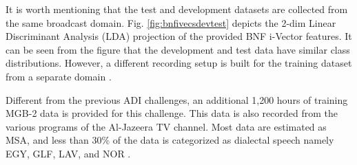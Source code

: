 \documentclass{article}
\begin{document}
\vspace{-6pt}
\begin{table}[h]\caption{The MGB-3 ADI databases: U stands for the number of utterances, D stands for the duration in hours, and W stands for the number of words in thousands.}\label{tab:datastat}
\vspace{5pt}
\centering
{}
\end{table}

\noindent It is worth mentioning that the test and development datasets are collected from the same broadcast domain. Fig. \ref{fig:bnfivecsdevtest} depicts the 2-dim Linear Discriminant Analysis (LDA) projection of the provided BNF i-Vector features. It can be seen from the figure that the development and test data have similar class distributions. However, a different recording setup is built for the training dataset from a separate domain \cite{Ali2017mgb3}. 

Different from the previous ADI challenges, an additional 1,200 hours of training MGB-2 data is provided for this challenge. This data is also recorded from the various programs of the Al-Jazeera TV channel. Most data are estimated as MSA, and less than 30\% of the data is categorized as dialectal speech namely EGY, GLF, LAV, and NOR \cite{ali2016mgb}.
\end{document}
